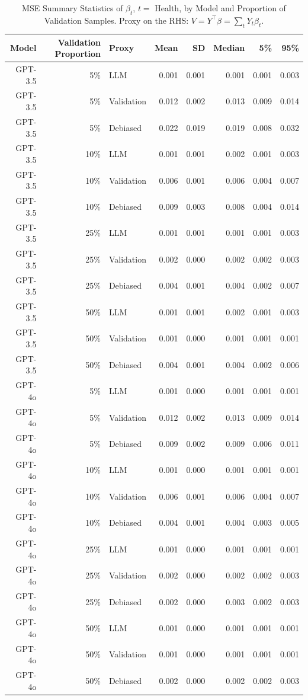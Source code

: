 \begin{table}

\caption{MSE Summary Statistics of $\beta_{t}$, $t=$ Health, by Model and Proportion of Validation Samples. Proxy on the RHS: $V = Y^\top \beta = \sum_{t} Y_t \beta_t$.}
\centering
\begin{tabular}[t]{rrlrrrrr}
\toprule
Model & Validation Proportion & Proxy & Mean & SD & Median & 5\% & 95\%\\
\midrule
GPT-3.5 & 5\% & LLM & 0.001 & 0.001 & 0.001 & 0.001 & 0.003\\
GPT-3.5 & 5\% & Validation & 0.012 & 0.002 & 0.013 & 0.009 & 0.014\\
GPT-3.5 & 5\% & Debiased & 0.022 & 0.019 & 0.019 & 0.008 & 0.032\\
GPT-3.5 & 10\% & LLM & 0.001 & 0.001 & 0.002 & 0.001 & 0.003\\
GPT-3.5 & 10\% & Validation & 0.006 & 0.001 & 0.006 & 0.004 & 0.007\\
GPT-3.5 & 10\% & Debiased & 0.009 & 0.003 & 0.008 & 0.004 & 0.014\\
GPT-3.5 & 25\% & LLM & 0.001 & 0.001 & 0.001 & 0.001 & 0.003\\
GPT-3.5 & 25\% & Validation & 0.002 & 0.000 & 0.002 & 0.002 & 0.003\\
GPT-3.5 & 25\% & Debiased & 0.004 & 0.001 & 0.004 & 0.002 & 0.007\\
GPT-3.5 & 50\% & LLM & 0.001 & 0.001 & 0.002 & 0.001 & 0.003\\
GPT-3.5 & 50\% & Validation & 0.001 & 0.000 & 0.001 & 0.001 & 0.001\\
GPT-3.5 & 50\% & Debiased & 0.004 & 0.001 & 0.004 & 0.002 & 0.006\\
GPT-4o & 5\% & LLM & 0.001 & 0.000 & 0.001 & 0.001 & 0.001\\
GPT-4o & 5\% & Validation & 0.012 & 0.002 & 0.013 & 0.009 & 0.014\\
GPT-4o & 5\% & Debiased & 0.009 & 0.002 & 0.009 & 0.006 & 0.011\\
GPT-4o & 10\% & LLM & 0.001 & 0.000 & 0.001 & 0.001 & 0.001\\
GPT-4o & 10\% & Validation & 0.006 & 0.001 & 0.006 & 0.004 & 0.007\\
GPT-4o & 10\% & Debiased & 0.004 & 0.001 & 0.004 & 0.003 & 0.005\\
GPT-4o & 25\% & LLM & 0.001 & 0.000 & 0.001 & 0.001 & 0.001\\
GPT-4o & 25\% & Validation & 0.002 & 0.000 & 0.002 & 0.002 & 0.003\\
GPT-4o & 25\% & Debiased & 0.002 & 0.000 & 0.003 & 0.002 & 0.003\\
GPT-4o & 50\% & LLM & 0.001 & 0.000 & 0.001 & 0.001 & 0.001\\
GPT-4o & 50\% & Validation & 0.001 & 0.000 & 0.001 & 0.001 & 0.001\\
GPT-4o & 50\% & Debiased & 0.002 & 0.000 & 0.002 & 0.002 & 0.003\\
\bottomrule
\end{tabular}
\end{table}
